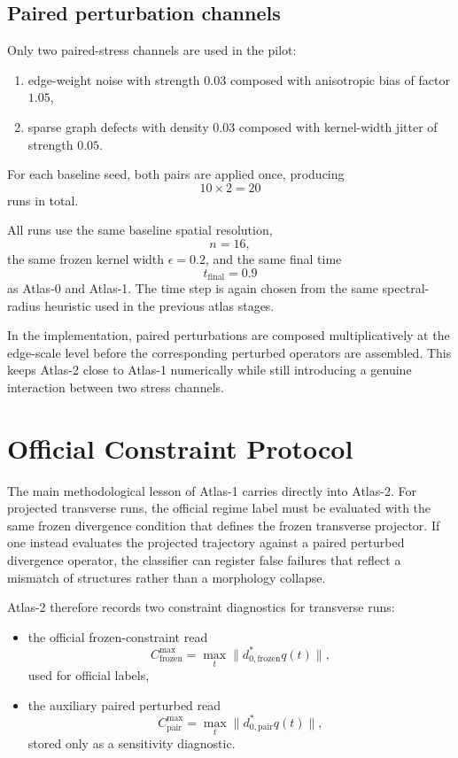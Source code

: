 \documentclass[11pt]{article}
\begin{document}
\subsection{Paired perturbation channels}
Only two paired-stress channels are used in the pilot:
\begin{enumerate}
\item edge-weight noise with strength $0.03$ composed with anisotropic bias of factor $1.05$,
\item sparse graph defects with density $0.03$ composed with kernel-width jitter of strength $0.05$.
\end{enumerate}
For each baseline seed, both pairs are applied once, producing
\begin{equation}
10 \times 2 = 20
\end{equation}
runs in total.

All runs use the same baseline spatial resolution,
\begin{equation}
n = 16,
\end{equation}
the same frozen kernel width $\epsilon = 0.2$, and the same final time
\begin{equation}
t_{\mathrm{final}} = 0.9
\end{equation}
as Atlas-0 and Atlas-1. The time step is again chosen from the same spectral-radius heuristic used in the previous atlas stages.

In the implementation, paired perturbations are composed multiplicatively at the edge-scale level before the corresponding perturbed operators are assembled. This keeps Atlas-2 close to Atlas-1 numerically while still introducing a genuine interaction between two stress channels.

\section{Official Constraint Protocol}
The main methodological lesson of Atlas-1 carries directly into Atlas-2. For projected transverse runs, the official regime label must be evaluated with the same frozen divergence condition that defines the frozen transverse projector. If one instead evaluates the projected trajectory against a paired perturbed divergence operator, the classifier can register false failures that reflect a mismatch of structures rather than a morphology collapse.

Atlas-2 therefore records two constraint diagnostics for transverse runs:
\begin{itemize}
\item the official frozen-constraint read
\begin{equation}
C_{\mathrm{frozen}}^{\max} = \max_t \|d_{0,\mathrm{frozen}}^{*} q(t)\|,
\end{equation}
used for official labels,
\item the auxiliary paired perturbed read
\begin{equation}
C_{\mathrm{pair}}^{\max} = \max_t \|d_{0,\mathrm{pair}}^{*} q(t)\|,
\end{equation}
stored only as a sensitivity diagnostic.
\end{itemize}
\end{document}
